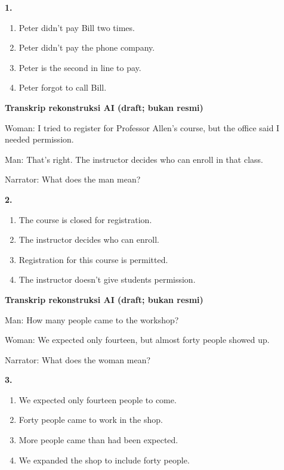 \documentclass[12pt]{article}
\begin{document}
\noindent\textbf{1.}
\begin{enumerate}[label=(\Alph*),leftmargin=*,itemsep=0.2em]
\item Peter didn't pay Bill two times.
\item Peter didn't pay the phone company.
\item Peter is the second in line to pay.
\item Peter forgot to call Bill.
\end{enumerate}
\par
\vspace{0.25\baselineskip}
\begin{exampleblock}
\textbf{Transkrip rekonstruksi AI (draft; bukan resmi)}\par
Woman: I tried to register for Professor Allen's course, but the office said I needed permission.\par
Man: That's right. The instructor decides who can enroll in that class.\par
Narrator: What does the man mean?\par
\end{exampleblock}
\noindent\textbf{2.}
\begin{enumerate}[label=(\Alph*),leftmargin=*,itemsep=0.2em]
\item The course is closed for registration.
\item The instructor decides who can enroll.
\item Registration for this course is permitted.
\item The instructor doesn't give students permission.
\end{enumerate}
\par
\vspace{0.25\baselineskip}
\begin{exampleblock}
\textbf{Transkrip rekonstruksi AI (draft; bukan resmi)}\par
Man: How many people came to the workshop?\par
Woman: We expected only fourteen, but almost forty people showed up.\par
Narrator: What does the woman mean?\par
\end{exampleblock}
\noindent\textbf{3.}
\begin{enumerate}[label=(\Alph*),leftmargin=*,itemsep=0.2em]
\item We expected only fourteen people to come.
\item Forty people came to work in the shop.
\item More people came than had been expected.
\item We expanded the shop to include forty people.
\end{enumerate}
\end{document}
